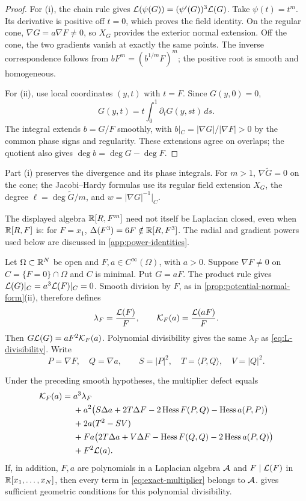 \begin{proof}
For \textup{(i)}, the chain rule gives \(\mathcal L(\psi(G))=(\psi'(G))^3\mathcal L(G)\).
Take \(\psi(t)=t^m\).
Its derivative is positive off \(t=0\), which proves the field
identity.  On the regular cone, \(\nabla G=a\nabla F\neq0\),
so \(X_G\) provides the exterior normal extension.  Off the cone,
the two gradients vanish at exactly the same points.  The inverse
correspondence follows from \(bF^m=(b^{1/m}F)^m\); the positive
root is smooth and homogeneous.

For \textup{(ii)}, use local coordinates \((y,t)\) with \(t=F\).
Since \(G(y,0)=0\),
\[
 G(y,t)=t\int_0^1\partial_tG(y,st)\,ds.
\]
The integral extends \(b=G/F\) smoothly, with
\(b|_C=|\nabla G|/|\nabla F|>0\) by the common phase signs and
regularity.  These extensions agree on overlaps; the quotient also
gives \(\deg b=\deg G-\deg F\).
\end{proof}

Part \textup{(i)} preserves the divergence and its phase integrals.
For \(m>1\), \(\nabla\widetilde G=0\) on the cone; the
Jacobi--Hardy formulas use its regular field extension \(X_G\), the degree
\(\ell=\deg\widetilde G/m\), and \(w=|\nabla G|^{-1}|_C\).

The displayed algebra \(\mathbb R[R,F^m]\) need not itself be Laplacian closed, even when
\(\mathbb R[R,F]\) is: for \(F=x_1\),
\(\Delta(F^3)=6F\notin\mathbb R[R,F^3]\).
The radial and gradient powers used below are discussed in
\cref{app:power-identities}.

Let \(\Omega\subset\mathbb R^N\) be open and \(F,a\in C^\infty(\Omega)\),
with \(a>0\). Suppose \(\nabla F\ne0\) on
\(C=\{F=0\}\cap\Omega\) and \(C\) is minimal. Put \(G=aF\).
The product rule gives \(\mathcal L(G)|_C=a^3\mathcal L(F)|_C=0\).
Smooth division by \(F\), as in
\cref{prop:potential-normal-form}\textup{(ii)}, therefore defines
\[
 \lambda_F=\frac{\mathcal L(F)}F,\qquad \mathcal K_F(a)=\frac{\mathcal L(aF)}F.
\]
Then \(G\mathcal L(G)=aF^2\mathcal K_F(a)\). Polynomial divisibility gives
the same \(\lambda_F\) as \eqref{eq:L-divisibility}. Write
\[
 P=\nabla F,\quad Q=\nabla a,\qquad
 S=|P|^2,\quad T=\langle P,Q\rangle,\quad V=|Q|^2.
\]

\begin{theorem}
\label{thm:exact-multiplier}
Under the preceding smooth hypotheses, the multiplier defect equals
\begin{align}
\mathcal K_F(a)={}&a^3\lambda_F\notag\\
&+a^2\bigl(S\Delta a+2T\Delta F-2\operatorname{Hess} F(P,Q)-\operatorname{Hess} a(P,P)\bigr)\notag\\
&+2a(T^2-SV)\notag\\
&+Fa\bigl(2T\Delta a+V\Delta F-\operatorname{Hess} F(Q,Q)
              -2\operatorname{Hess} a(P,Q)\bigr)\notag\\
&+F^2\mathcal L(a).                                           \label{eq:exact-multiplier}
\end{align}
If, in addition, \(F,a\) are polynomials in a Laplacian algebra
\(\mathcal A\) and \(F\mid\mathcal L(F)\) in \(\mathbb R[x_1,\ldots,x_N]\),
then every term in \eqref{eq:exact-multiplier} belongs to \(\mathcal A\).
 gives sufficient geometric conditions for
this polynomial divisibility.
\end{theorem}

